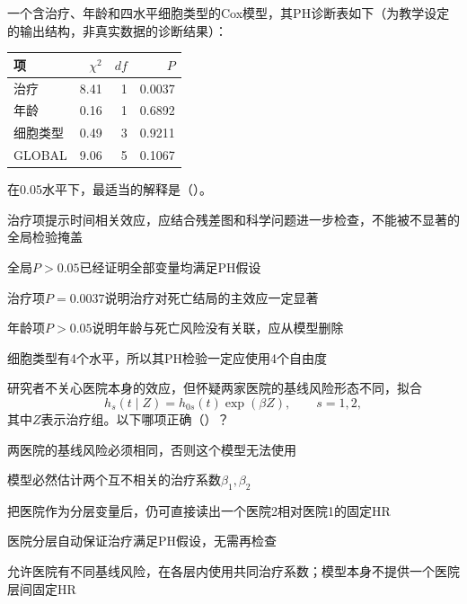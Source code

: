 \par\noindent\begin{minipage}{\linewidth}
一个含治疗、年龄和四水平细胞类型的Cox模型，其PH诊断表如下（为教学设定的输出结构，非真实数据的诊断结果）：
\begin{center}\begin{tabular}{lrrr}\toprule
项 & $\chi^2$ & $df$ & $P$\\\midrule
治疗 & 8.41 & 1 & 0.0037\\
年龄 & 0.16 & 1 & 0.6892\\
细胞类型 & 0.49 & 3 & 0.9211\\
GLOBAL & 9.06 & 5 & 0.1067\\\bottomrule
\end{tabular}\end{center}
在0.05水平下，最适当的解释是（\quad）。
\begin{choices}
\item 治疗项提示时间相关效应，应结合残差图和科学问题进一步检查，不能被不显著的全局检验掩盖
\item 全局$P>0.05$已经证明全部变量均满足PH假设
\item 治疗项$P=0.0037$说明治疗对死亡结局的主效应一定显著
\item 年龄项$P>0.05$说明年龄与死亡风险没有关联，应从模型删除
\item 细胞类型有4个水平，所以其PH检验一定应使用4个自由度
\end{choices}
\end{minipage}\par\medskip

\par\noindent\begin{minipage}{\linewidth}
研究者不关心医院本身的效应，但怀疑两家医院的基线风险形态不同，拟合
\[
h_s(t\mid Z)=h_{0s}(t)\exp(\beta Z),\qquad s=1,2,
\]
其中$Z$表示治疗组。以下哪项正确（\quad）？
\begin{choices}
\item 两医院的基线风险必须相同，否则这个模型无法使用
\item 模型必然估计两个互不相关的治疗系数$\beta_1,\beta_2$
\item 把医院作为分层变量后，仍可直接读出一个医院2相对医院1的固定HR
\item 医院分层自动保证治疗满足PH假设，无需再检查
\item 允许医院有不同基线风险，在各层内使用共同治疗系数；模型本身不提供一个医院层间固定HR
\end{choices}
\end{minipage}\par\medskip

